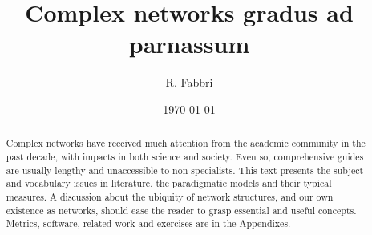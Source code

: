 \documentclass[%
 aip,
 jmp,%
 amsmath,amssymb,
 reprint,%
]{revtex4-1}
\begin{document}

\title[complex networks gradus]{Complex networks gradus ad parnassum}%

\author{R. Fabbri}
%

\date{\today}%

\begin{abstract}
Complex networks have received much attention from the academic community in the past decade,
with impacts in both science and society.
Even so, comprehensive guides are usually lengthy and unaccessible to non-specialists.
This text presents the subject and vocabulary issues in literature, the paradigmatic models and
their typical measures. A discussion about the ubiquity of network structures, and our own
existence as networks, should ease the reader to grasp essential and useful concepts.
Metrics, software, related work and exercises are in the Appendixes.
\end{abstract}

\maketitle

\end{document}
